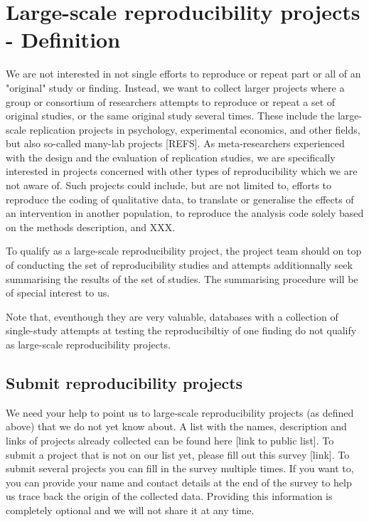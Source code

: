 \documentclass[a4paper,11pt]{report}
\begin{document}
\section*{Large-scale reproducibility projects - Definition}
We are not interested in not single efforts to reproduce or repeat part or all of an "original" study or finding. Instead, we want to collect larger projects where a group or consortium of researchers attempts to reproduce or repeat a set of original studies, or the same original study several times. These include the large-scale replication projects in psychology, experimental economics, and other fields, but also so-called many-lab projects [REFS]. As meta-researchers experienced with the design and the evaluation of replication studies, we are specifically interested in projects concerned with other types of reproducibility which we are not aware of. Such projects could include, but are not limited to, efforts to reproduce the coding of qualitative data, to translate or generalise the effects of an intervention in another population, to reproduce the analysis code solely based on the methods description, and XXX.

To qualify as a large-scale reproducibility project, the project team should on top of conducting the set of reproducibility studies and attempts additionnally seek summarising the results of the set of studies. The summarising procedure will be of special interest to us.

Note that, eventhough they are very valuable, databases with a collection of single-study attempts at testing the reproducibiltiy of one finding  do not qualify as large-scale reproducibility projects.

\subsection*{Submit reproducibility projects}
We need your help to point us to large-scale reproducibility projects (as defined above) that we do not yet know about. A list with the names, description and links of projects already collected can be found here [link to public list].
To submit a project that is not on our list yet, please fill out this survey [link]. To submit several projects you can fill in the survey multiple times. If you want to, you can provide your name and contact details at the end of the survey to help us trace back the origin of the collected data. Providing this information is completely optional and we will not share it at any time.
\end{document}
